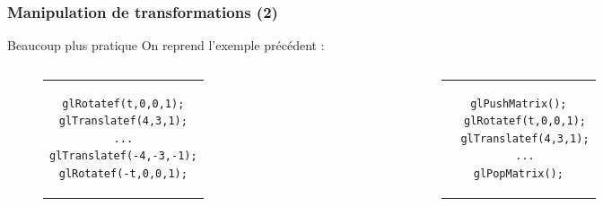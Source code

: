 \documentclass{beamer}
\begin{document}
\begin{frame}[fragile]
\frametitle{Manipulation de transformations (2)}
\begin{exampleblock}{Beaucoup plus pratique}
On reprend l'exemple précédent :
\begin{columns}
	\begin{column}{0.45\textwidth}
		\begin{block}{}
			\begin{figure}[h]
			\centering
			\begin{tabular}{c}
			\begin{lstlisting}
glRotatef(t,0,0,1);
glTranslatef(4,3,1);
...
glTranslatef(-4,-3,-1);
glRotatef(-t,0,0,1);
			\end{lstlisting}
			\end{tabular}
			\end{figure}
		\end{block}
	\end{column}
	\begin{column}{0.45\textwidth}
		\begin{block}{}
			\begin{figure}[h]
			\centering
			\begin{tabular}{c}
			\begin{lstlisting}
glPushMatrix();
  glRotatef(t,0,0,1);
  glTranslatef(4,3,1);
  ...
glPopMatrix();
			\end{lstlisting}
			\end{tabular}
			\end{figure}
		\end{block}
	\end{column}
\end{columns}
\end{exampleblock}
\end{frame}
\end{document}
